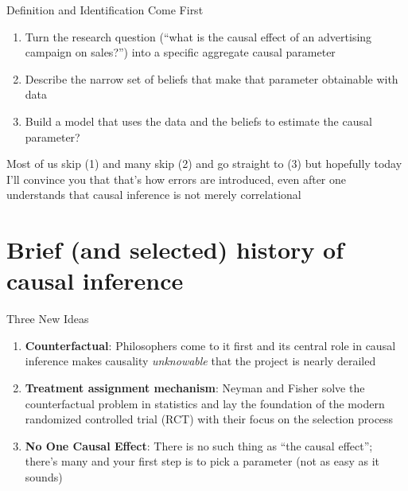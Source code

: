 \documentclass{beamer}
\begin{document}
\begin{frame}{Definition and Identification Come First}

\begin{enumerate}
\item Turn the research question (``what is the causal effect of an advertising campaign on sales?'') into a specific aggregate causal parameter
\item Describe the narrow set of beliefs that make that parameter obtainable with data
\item Build a model that uses the data and the beliefs to estimate the causal parameter?
\end{enumerate}

\bigskip

Most of us skip (1) and many skip (2) and go straight to (3) but hopefully today I'll convince you that that's how errors are introduced, even after one understands that causal inference is not merely correlational

\end{frame}

\section{Brief (and selected) history of causal inference}

\begin{frame}{Three New Ideas}

\begin{enumerate}
\item \textbf{Counterfactual}: Philosophers come to it first and its central role in causal inference makes causality \emph{unknowable} that the project is nearly derailed
\item \textbf{Treatment assignment mechanism}: Neyman and Fisher solve the counterfactual problem in statistics and lay the foundation of the modern randomized controlled trial (RCT) with their focus on the selection process
\item \textbf{No One Causal Effect}: There is no such thing as ``the causal effect''; there's many and your first step is to pick a parameter (not as easy as it sounds)
\end{enumerate}


\end{frame}
\end{document}
